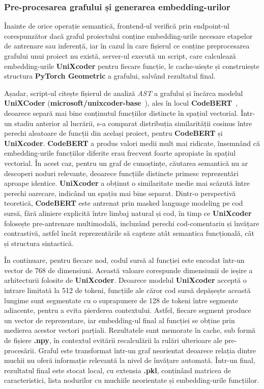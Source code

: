 \documentclass[12pt]{article}
\numberwithin{equation}{section}
\numberwithin{figure}{section}
\numberwithin{table}{section}
\theoremstyle{definition}
\theoremstyle{plain}
\begin{document}
\subsubsection{Pre-procesarea grafului și generarea embedding-urilor}

Înainte de orice operație semantică, frontend-ul verifică prin endpoint-ul corespunzător dacă graful proiectului conține embedding-urile necesare etapelor de antrenare sau inferență, iar în cazul în care fișierul ce conține preprocesarea grafului unui proiect nu există, server-ul execută un script, care calculează embedding-urile \textbf{UniXcoder} pentru fiecare funcție, le cache-uiește și construiește structura \textbf{PyTorch Geometric} a grafului, salvând rezultatul final.

Așadar, script-ul citește fișierul de analiză \textit{AST} a grafului și încărca modelul \textbf{UniXCoder} (\textbf{microsoft/unixcoder-base}~\cite{guo2022unixcoder}), ales în locul \textbf{CodeBERT}~\cite{feng2020codebert}, deoarece separă mai bine conținutul funcțiilor distincte în spațiul vectorial. Într-un stadiu anterior al lucrării, s-a comparat distribuția similarității cosinus între perechi aleatoare de funcții din același proiect, pentru \textbf{CodeBERT} și \textbf{UniXcoder}. \textbf{CodeBERT} a produs valori medii mult mai ridicate, însemnând că embedding-urile funcțiilor diferite erau frecvent foarte apropiate în spațiul vectorial. În acest caz, pentru un graf de cunoștințe, căutarea semantică nu ar descoperi noduri relevante, deoarece funcțiile distincte primesc reprezentări aproape identice. \textbf{UniXcoder} a obținut o similaritate medie mai scăzută între perechi oarecare, indicând un spațiu mai bine separat. Dintr-o perspectivă teoretică, \textbf{CodeBERT} este antrenat prin masked language modeling pe cod sursă, fără aliniere explicită între limbaj natural și cod, în timp ce \textbf{UniXcoder} folosește pre-antrenare multimodală, incluzând perechi cod-comentariu și învățare contrastivă, astfel încât reprezentările să capteze atât semantica funcțională, cât și structura sintactică.

În continuare, pentru fiecare nod, codul sursă al funcției este encodat într-un vector de 768 de dimensiuni. Această valoare corespunde dimensiunii de ieșire a arhitecturii folosite de \textbf{UniXcoder}. Deoarece modelul \textbf{UniXcoder} acceptă o intrare limitată la 512 de tokeni, funcțiile ale căror cod sursă depășește această lungime sunt segmentate cu o suprapunere de 128 de tokeni între segmente adiacente, pentru a evita pierderea contextului. Astfel, fiecare segment produce un vector de reprezentare, iar embedding-ul final al funcției se obține prin medierea acestor vectori parțiali. Rezultatele sunt memorate în cache, sub formă de fișiere \textbf{.npy}, în contextul evitării recalculării la rulări ulterioare ale pre-procesării. Graful este transformat într-un graf neorientat deoarece relația dintre muchii nu oferă informație relevantă la nivel de învățare automată. Într-un final, rezultatul final este stocat local, cu extensia \textbf{.pkl}, conținând matricea de caracteristici, lista nodurilor cu muchiile neorientate și embedding-urile funcțiilor.
\end{document}
